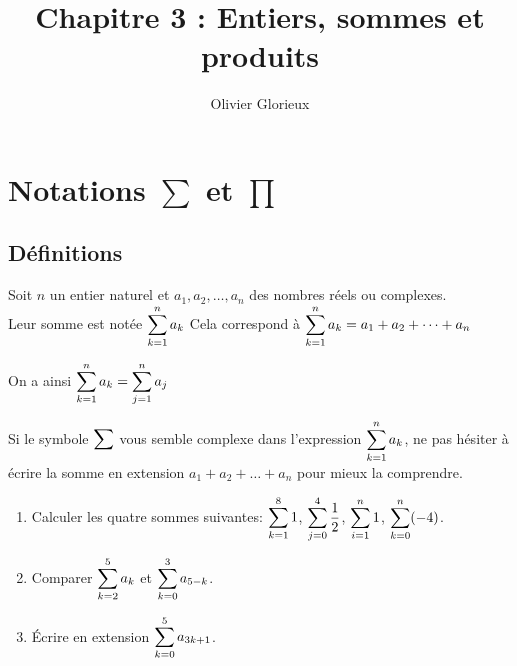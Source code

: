 \documentclass[a4paper, 11pt,reqno]{article}
\author{Olivier Glorieux}
\begin{document}
\tableofcontents
\title{Chapitre 3 : Entiers, sommes et produits}





\section{Notations $\sum$ et $\prod$ }
\subsection{Définitions}
\begin{defi} 
Soit $n$ un entier naturel et $a_1,a_2,\dots,a_n$ des nombres r\'eels ou complexes.\\
Leur somme est not\'ee  $\displaystyle \sum\limits_{k=1}^n a_k$
\noindent Cela correspond \`a $\displaystyle \sum\limits_{k=1}^n a_k=a_1+a_2+\dots +a_n$ 
\end{defi}
\begin{center}
\end{center}


On a ainsi $\displaystyle \sum\limits_{k=1}^n a_k=\displaystyle \sum\limits_{j=1}^n a_j$


\begin{rem}
\noindent Si le symbole $\displaystyle\sum$ vous semble complexe dans l'expression $\displaystyle \sum\limits_{k=1}^n a_k$, ne pas h\'esiter \`a \'ecrire la somme en extension $a_1+a_2+\dots+a_n$ pour mieux la comprendre. 
\end{rem}


{\footnotesize 
\begin{exercice} 
\begin{enumerate}
\item Calculer les quatre sommes suivantes: $\displaystyle\sum\limits_{k=1}^8 1$, $\displaystyle\sum\limits_{j=0}^4 \displaystyle\frac{1}{2}$, $\displaystyle\sum\limits_{i=1}^n 1$, $\displaystyle\sum\limits_{k=0}^n (-4)$.
\item Comparer $\displaystyle\sum\limits_{k=2}^5 a_k$ et $\displaystyle\sum\limits_{k=0}^3 a_{5-k}$.
\item \'Ecrire en extension $\displaystyle\sum\limits_{k=0}^5 a_{3k+1}$.
\end{enumerate}
\end{exercice}}
 
\end{document}
